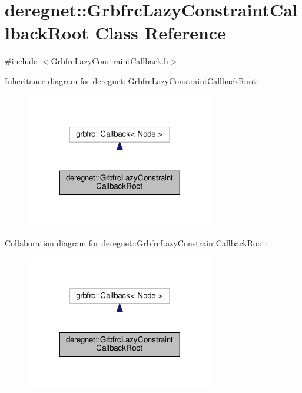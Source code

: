 \hypertarget{classderegnet_1_1GrbfrcLazyConstraintCallbackRoot}{}\section{deregnet\+:\+:Grbfrc\+Lazy\+Constraint\+Callback\+Root Class Reference}
\label{classderegnet_1_1GrbfrcLazyConstraintCallbackRoot}


{\ttfamily \#include $<$Grbfrc\+Lazy\+Constraint\+Callback.\+h$>$}



Inheritance diagram for deregnet\+:\+:Grbfrc\+Lazy\+Constraint\+Callback\+Root\+:
\nopagebreak
\begin{figure}[H]
\begin{center}
\leavevmode
\includegraphics[width=233pt]{classderegnet_1_1GrbfrcLazyConstraintCallbackRoot__inherit__graph}
\end{center}
\end{figure}


Collaboration diagram for deregnet\+:\+:Grbfrc\+Lazy\+Constraint\+Callback\+Root\+:
\nopagebreak
\begin{figure}[H]
\begin{center}
\leavevmode
\includegraphics[width=233pt]{classderegnet_1_1GrbfrcLazyConstraintCallbackRoot__coll__graph}
\end{center}
\end{figure}

